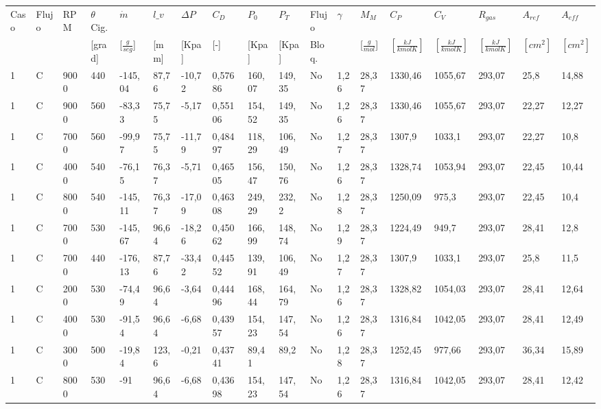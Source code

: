 {\tiny
\begin{landscape}
    \begin{longtable}{llllllllllllllllll} \toprule
    Caso & Flujo & RPM & $\theta$ Cig. & $\dot{m}$ & $l\_v$ & $\Delta P$ & $C_D$ & $P_0$ & $P_T$ & Flujo & $\gamma$ & $M_M$ & $C_P$ & $C_V$ & $R_{gas}$ & $A_{ref}$ & $A_{eff}$ \\
     &  &  & [grad] & [$\frac{g}{seg}$] & [mm] & [Kpa] & [-] & [Kpa] & [Kpa] & Bloq. &  & [$\frac{g}{mol}$] & $[\frac{kJ}{kmol K}]$ & $[\frac{kJ}{kmol K}]$ & $[\frac{kJ}{kmol K}]$ & $[cm^2]$ & $[cm^2]$ \\ \midrule
    1 & C & 9000 & 440 & -145,04 & 87,76 & -10,72 & 0,57686 & 160,07 & 149,35 & No & 1,26 & 28,37 & 1330,46 & 1055,67 & 293,07 & 25,8 & 14,88 \\
    1 & C & 9000 & 560 & -83,33 & 75,75 & -5,17 & 0,55106 & 154,52 & 149,35 & No & 1,26 & 28,37 & 1330,46 & 1055,67 & 293,07 & 22,27 & 12,27 \\
    1 & C & 7000 & 560 & -99,97 & 75,75 & -11,79 & 0,48497 & 118,29 & 106,49 & No & 1,27 & 28,37 & 1307,9 & 1033,1 & 293,07 & 22,27 & 10,8 \\
    1 & C & 4000 & 540 & -76,15 & 76,37 & -5,71 & 0,46505 & 156,47 & 150,76 & No & 1,26 & 28,37 & 1328,74 & 1053,94 & 293,07 & 22,45 & 10,44 \\
    1 & C & 8000 & 540 & -145,11 & 76,37 & -17,09 & 0,46308 & 249,29 & 232,2 & No & 1,28 & 28,37 & 1250,09 & 975,3 & 293,07 & 22,45 & 10,4 \\
    1 & C & 7000 & 530 & -145,67 & 96,64 & -18,26 & 0,45062 & 166,99 & 148,74 & No & 1,29 & 28,37 & 1224,49 & 949,7 & 293,07 & 28,41 & 12,8 \\
    1 & C & 7000 & 440 & -176,13 & 87,76 & -33,42 & 0,44552 & 139,91 & 106,49 & No & 1,27 & 28,37 & 1307,9 & 1033,1 & 293,07 & 25,8 & 11,5 \\
    1 & C & 2000 & 530 & -74,49 & 96,64 & -3,64 & 0,44496 & 168,44 & 164,79 & No & 1,26 & 28,37 & 1328,82 & 1054,03 & 293,07 & 28,41 & 12,64 \\
    1 & C & 4000 & 530 & -91,54 & 96,64 & -6,68 & 0,43957 & 154,23 & 147,54 & No & 1,26 & 28,37 & 1316,84 & 1042,05 & 293,07 & 28,41 & 12,49 \\
    1 & C & 3000 & 500 & -19,84 & 123,6 & -0,21 & 0,43741 & 89,41 & 89,2 & No & 1,28 & 28,37 & 1252,45 & 977,66 & 293,07 & 36,34 & 15,89 \\
    1 & C & 8000 & 530 & -91 & 96,64 & -6,68 & 0,43698 & 154,23 & 147,54 & No & 1,26 & 28,37 & 1316,84 & 1042,05 & 293,07 & 28,41 & 12,42 \\

\end{longtable}
\end{landscape}}

